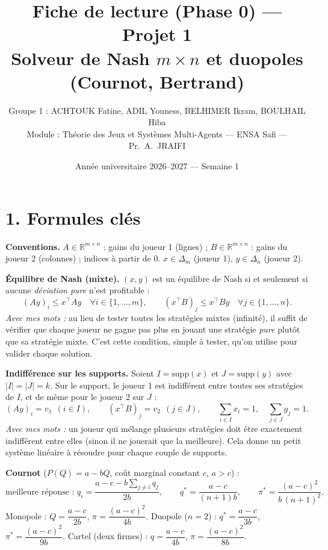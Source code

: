 \documentclass[11pt,a4paper]{article}
\title{\vspace{-1.2cm}\textbf{Fiche de lecture (Phase 0) — Projet 1}\\[2pt]
\large Solveur de Nash $m\times n$ et duopoles (Cournot, Bertrand)}
\author{Groupe 1 : ACHTOUK Fatine, ADIL Youness, BELHIMER Ikram, BOULHAIL Hiba\\
\small Module : Théorie des Jeux et Systèmes Multi-Agents --- ENSA Safi --- Pr.\ A.\ JRAIFI}
\date{Année universitaire 2026--2027 --- Semaine 1}
\newcommand{\R}{\mathbb{R}}
\begin{document}
\maketitle
\vspace{-0.6cm}

\section*{1. Formules clés}
\noindent\textbf{Conventions.} $A\in\R^{m\times n}$ : gains du joueur 1 (lignes) ;
$B\in\R^{m\times n}$ : gains du joueur 2 (colonnes) ; indices à partir de $0$.
$x\in\Delta_m$ (joueur 1), $y\in\Delta_n$ (joueur 2).

\smallskip
\noindent\textbf{Équilibre de Nash (mixte).} $(x,y)$ est un équilibre de Nash si et seulement
si aucune \emph{déviation pure} n'est profitable :
\begin{equation}
(Ay)_i \le x^{\top} A y \quad \forall i \in \{1,\dots,m\},
\qquad
(x^{\top}B)_j \le x^{\top} B y \quad \forall j \in \{1,\dots,n\}.
\end{equation}
\emph{Avec mes mots :} au lieu de tester toutes les stratégies mixtes (infinité), il suffit de
vérifier que chaque joueur ne gagne pas plus en jouant une stratégie \emph{pure} plutôt que sa
stratégie mixte. C'est cette condition, simple à tester, qu'on utilise pour valider chaque
solution.

\smallskip
\noindent\textbf{Indifférence sur les supports.} Soient $I=\mathrm{supp}(x)$ et
$J=\mathrm{supp}(y)$ avec $|I|=|J|=k$. Sur le support, le joueur 1 est indifférent entre
toutes ses stratégies de $I$, et de même pour le joueur 2 sur $J$ :
\begin{equation}
(Ay)_i = v_1 \ \ (i\in I),
\qquad
(x^{\top}B)_j = v_2 \ \ (j\in J),
\qquad
\sum_{i\in I} x_i = 1,\quad \sum_{j\in J} y_j = 1 .
\end{equation}
\emph{Avec mes mots :} un joueur qui mélange plusieurs stratégies doit être exactement
indifférent entre elles (sinon il ne jouerait que la meilleure). Cela donne un petit système
linéaire à résoudre pour chaque couple de supports.

\smallskip
\noindent\textbf{Cournot} ($P(Q)=a-bQ$, coût marginal constant $c$, $a>c$) :
\begin{equation}
\text{meilleure réponse : } q_i=\frac{a-c-b\sum_{j\ne i} q_j}{2b},
\qquad
q^{*}=\frac{a-c}{(n+1)b},
\qquad
\pi^{*}=\frac{(a-c)^2}{b\,(n+1)^2}.
\end{equation}
Monopole : $Q=\dfrac{a-c}{2b}$, $\pi=\dfrac{(a-c)^2}{4b}$.
Duopole ($n=2$) : $q^{*}=\dfrac{a-c}{3b}$, $\pi^{*}=\dfrac{(a-c)^2}{9b}$.
Cartel (deux firmes) : $q=\dfrac{a-c}{4b}$, $\pi=\dfrac{(a-c)^2}{8b}$.
\end{document}

